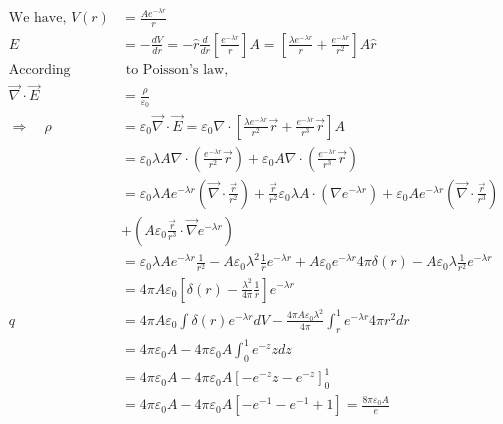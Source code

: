 \begin{enumerate}[label=\color{ocre}\textbf{\arabic*.}]
\begin{answer}
		
		\begin{align*}
		\text{We have, } V(r)&=\frac{A e^{-\lambda r}}{r}\\
		E&=-\frac{d V}{d r}=-\hat{r} \frac{d}{d r}\left[\frac{e^{-\lambda r}}{r}\right] A=\left[\frac{\lambda e^{-\lambda r}}{r}+\frac{e^{-\lambda r}}{r^{2}}\right] A \hat{r}\\
		\text{According}&\text{ to Poisson's law,}\\
		\vec{\nabla} \cdot \vec{E}&=\frac{\rho}{\varepsilon_{0}} \\
		\Rightarrow \quad \rho&=\varepsilon_{0} \vec{\nabla} \cdot \vec{E}=\varepsilon_{0} \nabla \cdot\left[\frac{\lambda e^{-\lambda r}}{r^{2}} \vec{r}+\frac{e^{-\lambda r}}{r^{3}} \vec{r}\right] A\\&=\varepsilon_{0} \lambda A \nabla \cdot\left(\frac{e^{-\lambda r}}{r^{2}} \vec{r}\right)+\varepsilon_{0} A \nabla \cdot\left(\frac{e^{-\lambda r}}{r^{3}} \vec{r}\right) \\
		&=\varepsilon_{0} \lambda A e^{-\lambda r}\left(\vec{\nabla} \cdot \frac{\vec{r}}{r^{2}}\right)+\frac{\vec{r}}{r^{2}} \varepsilon_{0} \lambda A \cdot\left(\nabla e^{-\lambda r}\right)+\varepsilon_{0} A e^{-\lambda r}\left(\vec{\nabla} \cdot \frac{\vec{r}}{r^{3}}\right)\\&+\left(A \varepsilon_{0} \frac{\vec{r}}{r^{3}} \cdot \vec{\nabla} e^{-\lambda r}\right) \\
		&=\varepsilon_{0} \lambda A e^{-\lambda r} \frac{1}{r^{2}}-A \varepsilon_{0} \lambda^{2} \frac{1}{r} e^{-\lambda r}+A \varepsilon_{0} e^{-\lambda r} 4 \pi \delta(r)-A \varepsilon_{0} \lambda \frac{1}{r^{2}} e^{-\lambda r}\\
		&=4 \pi A \varepsilon_{0}\left[\delta(r)-\frac{\lambda^{2}}{4 \pi} \frac{1}{r}\right] e^{-\lambda r} \\
		q&=4 \pi A \varepsilon_{0} \int \delta(r) e^{-\lambda r} d V-\frac{4 \pi A \varepsilon_{0} \lambda^{2}}{4 \pi} \int_{r}^{1} e^{-\lambda r} 4 \pi r^{2} d r \\
		&=4 \pi \varepsilon_{0} A-4 \pi \varepsilon_{0} A \int_{0}^{1} e^{-z} z d z \\
		&=4 \pi \varepsilon_{0} A-4 \pi \varepsilon_{0} A\left[-e^{-z} z-e^{-z}\right]_{0}^{1} \\
		&=4 \pi \varepsilon_{0} A-4 \pi \varepsilon_{0} A\left[-e^{-1}-e^{-1}+1\right]=\frac{8 \pi \varepsilon_{0} A}{e}
		\end{align*}
		

\end{answer}
\end{enumerate}
